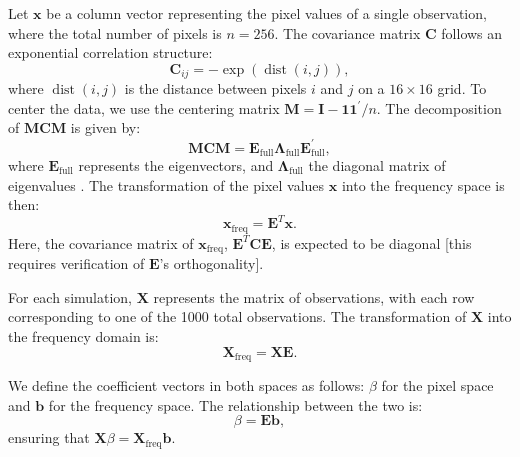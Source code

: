 \documentclass[12pt]{article}
\begin{document}
Let \( \mathbf{x} \) be a column vector representing the pixel values of a single observation, where the total number of pixels is \( n = 256 \). The covariance matrix \( \mathbf{C} \) follows an exponential correlation structure:
\[
\mathbf{C}_{ij} = -\exp(\operatorname{dist}(i,j)),
\]
where \( \operatorname{dist}(i,j) \) is the distance between pixels \( i \) and \( j \) on a \( 16 \times 16 \) grid. To center the data, we use the centering matrix \( \mathbf{M} = \mathbf{I} - \mathbf{1} \mathbf{1}^{\prime} / n \). The decomposition of \( \mathbf{MCM} \) is given by:
\[
\mathbf{MCM} = \mathbf{E}_{\text{full}} \mathbf{\Lambda}_{\text{full}} \mathbf{E}_{\text{full}}^{\prime},
\]
where \( \mathbf{E}_{\text{full}} \) represents the eigenvectors, and \( \mathbf{\Lambda}_{\text{full}} \) the diagonal matrix of eigenvalues \cite{murakami2019eigenvector}. The transformation of the pixel values \( \mathbf{x} \) into the frequency space is then:
\[
\mathbf{x}_{\text{freq}} = \mathbf{E}^T \mathbf{x}.
\]
Here, the covariance matrix of \( \mathbf{x}_{\text{freq}} \), \( \mathbf{E}^T \mathbf{C} \mathbf{E} \), is expected to be diagonal [this requires verification of \( \mathbf{E} \)'s orthogonality].

For each simulation, \( \mathbf{X} \) represents the matrix of observations, with each row corresponding to one of the 1000 total observations. The transformation of \( \mathbf{X} \) into the frequency domain is:
\[
\mathbf{X}_{\mathrm{freq}} = \mathbf{X} \mathbf{E}.
\]

We define the coefficient vectors in both spaces as follows: \( \beta \) for the pixel space and \( \mathbf{b} \) for the frequency space. The relationship between the two is:
\[
\beta = \mathbf{E} \mathbf{b},
\]
ensuring that \( \mathbf{X} \beta = \mathbf{X}_{\mathrm{freq}} \mathbf{b} \).
\end{document}
